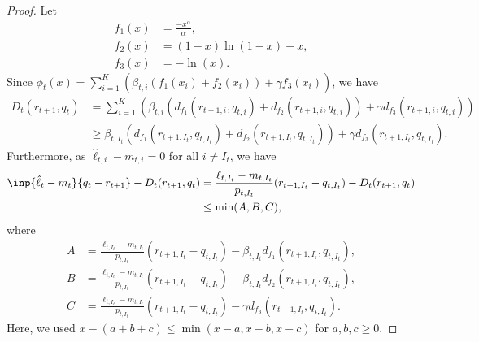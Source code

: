 \begin{proof}
    Let 
    \begin{align*}
        f_1(x) &= \frac{-x^\alpha}{\alpha}, \\
        f_2(x) &= (1-x)\ln(1-x) + x, \\
        f_3(x) &= -\ln(x).
    \end{align*}
    Since $\phi_t(x) = \sum_{i=1}^K \left(\beta_{t,i}(f_1(x_i) + f_2(x_i)) + \gamma f_3(x_i)\right)$, we have
    \begin{align*}
        D_t(r_{t+1}, q_t) &= \sum_{i=1}^K \left( \beta_{t,i}(d_{f_1}(r_{t+1,i}, q_{t,i}) + d_{f_2}(r_{t+1,i}, q_{t,i})) + \gamma d_{f_3}(r_{t+1,i}, q_{t,i}) \right) \\
        &\geq \beta_{t,I_t}(d_{f_1}(r_{t+1,I_t}, q_{t,I_t}) + d_{f_2}(r_{t+1,I_t}, q_{t,I_t})) + \gamma d_{f_3}(r_{t+1,I_t}, q_{t,I_t}).
    \end{align*}
    Furthermore, as $\hat{\ell}_{t,i} - m_{t,i} = 0$ for all $i \neq I_t$, we have
    \begin{align*}
        \inp{\hat{\ell}_t - m_t}{q_t - r_{t+1}} - D_t(r_{t+1}, q_t) &= \frac{\ell_{t,I_t} - m_{t,I_t}}{p_{t,I_t}}(r_{t+1, I_t} - q_{t,I_t}) - D_t(r_{t+1}, q_t) \\
        &\leq \min(A, B, C),
    \end{align*}
    where 
    \begin{align*}
        A &= \frac{\ell_{t,I_t} - m_{t,I_t}}{p_{t,I_t}}(r_{t+1, I_t}- q_{t,I_t}) - \beta_{t,I_t}d_{f_1}(r_{t+1,I_t}, q_{t,I_t}), \\
        B &= \frac{\ell_{t,I_t} - m_{t,I_t}}{p_{t,I_t}}(r_{t+1, I_t}- q_{t,I_t}) - \beta_{t,I_t} d_{f_2}(r_{t+1,I_t}, q_{t,I_t}), \\
        C &= \frac{\ell_{t,I_t} - m_{t,I_t}}{p_{t,I_t}}(r_{t+1, I_t}- q_{t,I_t}) - \gamma d_{f_3}(r_{t+1,I_t}, q_{t,I_t}).
    \end{align*}
    Here, we used $x - (a+b+c) \leq \min(x - a, x - b, x - c)$ for $a, b, c \geq 0$. 
    

\end{proof}
